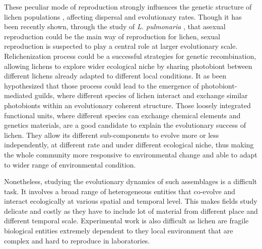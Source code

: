 \documentclass[runningheads,a4paper]{llncs}
\begin{document}
These peculiar mode of reproduction strongly influences the genetic structure of lichen populations \cite{dal2012vertical,dal2011phylogeny}, affecting dispersal and evolutionary rates. 
Though it has been recently shown, through the study of {\em L. pulmonaria} \cite{dal2012vertical}, that asexual reproduction could be the main way of reproduction for lichen, sexual reproduction is suspected to play a central role at larger evolutionary scale. Relichenization process could be a successful strategies for genetic recombination, allowing lichens to  explore wider ecological niche by sharing photobiont between different lichens already adapted to different local conditions. It as been hypothesized \cite{rikkinen2003ecological} that those process could lead to the emergence of photobiont-mediated guilds, where different species of lichen interact and exchange similar photobionts within an evolutionary coherent structure. Those loosely integrated functional units, where different species can exchange chemical elements and genetics materials, are a good candidate to explain the evolutionary success of lichen. They allow its different sub-components to evolve more or less independently, at different rate and under different ecological niche, thus making the whole community more responsive to environmental change and able to adapt to wider range of environmental condition.

Nonetheless, studying the evolutionary dynamics of such assemblages is a difficult task. It involves a broad range of heterogeneous entities that co-evolve and interact ecologically at various spatial and temporal level. This makes fields study delicate and costly as they have to include lot of material from different place and different temporal scale. Experimental work is also difficult as lichen are fragile biological entities extremely dependent to they local environment that are complex and hard to reproduce in laboratories.    
\end{document}
